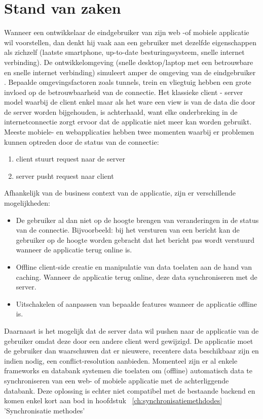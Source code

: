 \section{Stand van zaken}
\label{sec:stand-van-zaken}
Wanneer een ontwikkelaar de eindgebruiker van zijn web -of mobiele applicatie wil voorstellen, dan denkt hij vaak aan een gebruiker met dezelfde eigenschappen als zichzelf (laatste smartphone, up-to-date besturingssysteem,  snelle internet verbinding). De ontwikkelomgeving (snelle desktop/laptop met een betrouwbare en snelle internet verbinding) simuleert amper de omgeving van de eindgebruiker \autocite{chrome-offline-first-statement}. Bepaalde omgevingsfactoren zoals tunnels, trein en vliegtuig hebben een grote invloed op de betrouwbaarheid van de connectie. Het klassieke client - server model waarbij de client enkel maar als het ware een view is van de data die door de server worden bijgehouden, is achterhaald, want elke onderbreking in de internetconnectie zorgt ervoor dat de applicatie niet meer kan worden gebruikt.
\clearpage
Meeste mobiele- en webapplicaties hebben twee momenten waarbij er problemen kunnen optreden door de status van de connectie:
\begin{enumerate}  
\item client stuurt request naar de server
\item server pusht request naar client
\end{enumerate}
Afhankelijk van de business context van de applicatie, zijn er verschillende mogelijkheden:
\begin{itemize}  
\item De gebruiker al dan niet op de hoogte brengen van veranderingen in de status van de connectie. Bijvoorbeeld: bij het versturen van een bericht kan de gebruiker op de hoogte worden gebracht dat het bericht pas wordt verstuurd wanneer de applicatie terug online is.
\item Offline client-side creatie en manipulatie van data toelaten aan de hand van caching. Wanneer de applicatie terug online, deze data synchroniseren met de server.
\item Uitschakelen of aanpassen van bepaalde features wanneer de applicatie offline is.
\end{itemize}
Daarnaast is het mogelijk dat de server data wil pushen naar de applicatie van de gebruiker omdat deze door een andere client werd gewijzigd. De applicatie moet de gebruiker dan waarschuwen dat er nieuwere, recentere data beschikbaar zijn en indien nodig, een conflict-resolution aanbieden. Momenteel zijn er al enkele frameworks en databank systemen die toelaten om (offline) automatisch data te synchroniseren van een web- of mobiele applicatie met de achterliggende databank. Deze oplossing is echter niet compatibel met de bestaande backend en komen enkel kort aan bod in hoofdstuk ~\ref{ch:synchronisatiemethdodes} 'Synchronisatie methodes'
